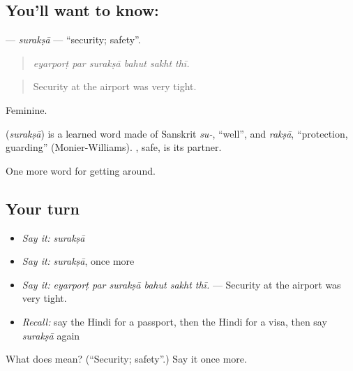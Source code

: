 \subsection*{You'll want to know: }
\textbf{} — \emph{surakṣā} — \textquotedblleft{}security; safety\textquotedblright{}.

\begin{quote}
     
\end{quote}

\begin{quote}
\emph{eyarporṭ par surakṣā bahut sakht thī.}
\end{quote}

\begin{quote}
Security at the airport was very tight.
\end{quote}

Feminine.

\begin{cousinweb}
\textbf{} (\emph{surakṣā}) is a learned word made of Sanskrit \emph{su-}, \textquotedblleft{}well\textquotedblright{}, and \emph{rakṣā}, \textquotedblleft{}protection, guarding\textquotedblright{} (Monier-Williams). , safe, is its partner.
\end{cousinweb}

\begin{grammarlens}[title={What you've built}]
One more word for getting around.
\end{grammarlens}

\subsection*{Your turn}
\begin{itemize}
\raggedright
  \item \emph{Say it:} \emph{surakṣā}
  \item \emph{Say it:} \emph{surakṣā}, once more
  \item \emph{Say it:} \emph{eyarporṭ par surakṣā bahut sakht thī.} — Security at the airport was very tight.
  \item \emph{Recall:} say the Hindi for a passport, then the Hindi for a visa, then say \emph{surakṣā} again
\end{itemize}

\begin{tcolorbox}[breakable,colback=teal!4,colframe=teal!35!black,title={Before you move on}]
What does  mean? (\textquotedblleft{}Security; safety\textquotedblright{}.) Say it once more.
\end{tcolorbox}
